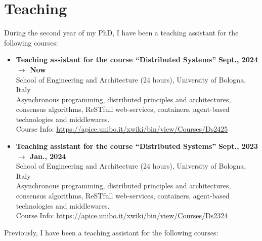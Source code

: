 \documentclass[11pt]{article}
\begin{document}
\section{Teaching}\label{sec:teaching}
%
During the second year of my PhD, I have been a teaching assistant for the following courses:
%
\begin{itemize}
	\item \textbf{Teaching assistant for the course ``Distributed Systems'' }\hfill \textbf{Sept., 2024 $\rightarrow$ Now}
	\\School of Engineering and Architecture (24 hours), University of Bologna, Italy
	\\Asynchronous programming, distributed principles and architectures, consensus algorithms, ReSTfull web-services, containers, agent-based technologies and middlewares.
	\\Course Info: \url{https://apice.unibo.it/xwiki/bin/view/Courses/Ds2425}
	\item \textbf{ Teaching assistant for the course ``Distributed Systems'' }\hfill \textbf{Sept., 2023 $\rightarrow$ Jan., 2024}
	\\School of Engineering and Architecture (24 hours), University of Bologna, Italy
	\\Asynchronous programming, distributed principles and architectures, consensus algorithms, ReSTfull web-services, containers, agent-based technologies and middlewares.
	\\Course Info: \url{https://apice.unibo.it/xwiki/bin/view/Courses/Ds2324}
\end{itemize}
%
Previously, I have been a teaching assistant for the following courses:
%
\end{document}
